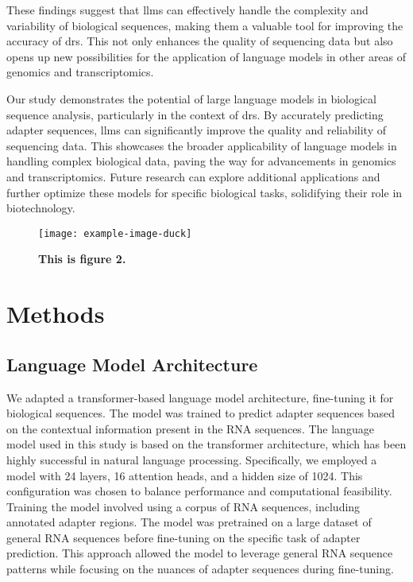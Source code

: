 \documentclass[pdflatex, sn-mathphys-num, lineno]{sn-jnl}%
\theoremstyle{thmstyleone}%
\theoremstyle{thmstyletwo}%
\theoremstyle{thmstylethree}%
\begin{document}
These findings suggest that \glspl{llm} can effectively handle the complexity and variability of biological sequences, making them a valuable tool for improving the accuracy of \gls{drs}.
This not only enhances the quality of sequencing data but also opens up new possibilities for the application of language models in other areas of genomics and transcriptomics.


Our study demonstrates the potential of large language models in biological sequence analysis, particularly in the context of \gls{drs}.
By accurately predicting adapter sequences,  \glspl{llm} can significantly improve the quality and reliability of sequencing data.
This showcases the broader applicability of language models in handling complex biological data, paving the way for advancements in genomics and transcriptomics.
Future research can explore additional applications and further optimize these models for specific biological tasks, solidifying their role in biotechnology.

\begin{figure}[!h]
	\texttt{[image: example-image-duck]}
	\caption{\bf This is figure 2.}
	\label{fig:f2}
\end{figure}

\section{Methods}\label{sec2}

\subsection{Language Model Architecture}

We adapted a transformer-based language model architecture, fine-tuning it for biological sequences. The model was trained to predict adapter sequences based on the contextual information present in the RNA sequences.
The language model used in this study is based on the transformer architecture, which has been highly successful in natural language processing.
Specifically, we employed a model with \num{24} layers, \num{16} attention heads, and a hidden size of \num{1024}.
This configuration was chosen to balance performance and computational feasibility.
Training the model involved using a corpus of RNA sequences, including annotated adapter regions.
The model was pretrained on a large dataset of general RNA sequences before fine-tuning on the specific task of adapter prediction.
This approach allowed the model to leverage general RNA sequence patterns while focusing on the nuances of adapter sequences during fine-tuning.
\end{document}
